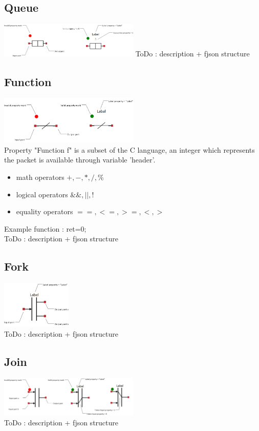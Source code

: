 \documentclass[a4paper,11pt,final]{article}
\begin{document}
\subsection{Queue}
\includegraphics[width=0.5\textwidth]{queue}
ToDo : description + fjson structure
\subsection{Function}
\includegraphics[width=0.5\textwidth]{function}
\\Property "Function f" is a subset of the C language, an integer which represents the packet is available through variable 'header'. 
\begin{itemize}
\item math operators $+,-,*,/,\%$
\item logical operators $\&\&,||,!$
\item equality operators $==,<=,>=,<,>$
\end{itemize} 
Example function : ret=0;
\\ToDo : description + fjson structure
\subsection{Fork}
\includegraphics[width=0.25\textwidth]{fork}
\\ToDo : description + fjson structure
\subsection{Join}
\includegraphics[width=0.5\textwidth]{join}
\\ToDo : description + fjson structure
\end{document}
